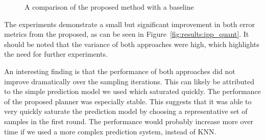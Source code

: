 \begin{figure}[h]
    \hfill
    \caption{A comparison of the proposed method with a baseline}
    \label{fig:results:ipp_paired}
\end{figure}

The experiments demonstrate a small but significant improvement in both error metrics from the proposed, as can be seen in Figure~\ref{fig:results:ipp_quant}. It should be noted that the variance of both approaches were high, which highlights the need for further experiments.

An interesting finding is that the performance of both approaches did not improve dramatically over the sampling iterations. This can likely be attributed to the simple prediction model we used which saturated quickly. The performance of the proposed planner was especially stable. This suggests that it was able to very quickly saturate the prediction model by choosing a representative set of samples in the first round. The performance would probably increase more over time if we used a more complex prediction system, instead of KNN.

